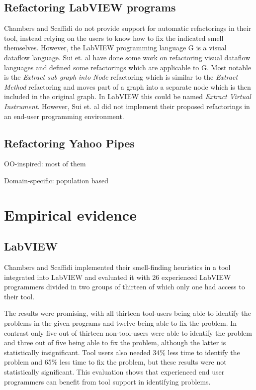 \documentclass[10pt,conference,compsocconf]{IEEEtran}
\begin{document}
\subsection{Refactoring LabVIEW programs}

Chambers and Scaffidi \cite{chambers2013smell} do not provide support for automatic refactorings in their tool, instead relying on the users to know how to fix the indicated smell themselves.
However, the LabVIEW programming language G is a visual dataflow language.
Sui et. al \cite{sui2008automated} have done some work on refactoring visual dataflow languages and defined some refactorings which are applicable to G.
Most notable is the \textit{Extract sub graph into Node} refactoring which is similar to the \textit{Extract Method} refactoring and moves part of a graph into a separate node which is then included in the original graph.
In LabVIEW this could be named \textit{Extract Virtual Instrument}.
However, Sui et. al did not implement their proposed refactorings in an end-user programming environment.

\subsection{Refactoring Yahoo Pipes}

OO-inspired: most of them

Domain-specific: population based


\section{Empirical evidence}
\label{sec:empirical}

\subsection{LabVIEW}

Chambers and Scaffidi implemented their smell-finding heuristics in a tool integrated into LabVIEW and evaluated it with 26 experienced LabVIEW programmers divided in two groups of thirteen of which only one had access to their tool.

The results were promising, with all thirteen tool-users being able to identify the problems in the given programs and twelve being able to fix the problem.
In contrast only five out of thirteen non-tool-users were able to identify the problem and three out of five being able to fix the problem, although the latter is statistically insignificant.
Tool users also needed 34\% less time to identify the problem and 65\% less time to fix the problem, but these results were not statistically significant.
This evaluation shows that experienced end user programmers can benefit from tool support in identifying problems.
\end{document}
